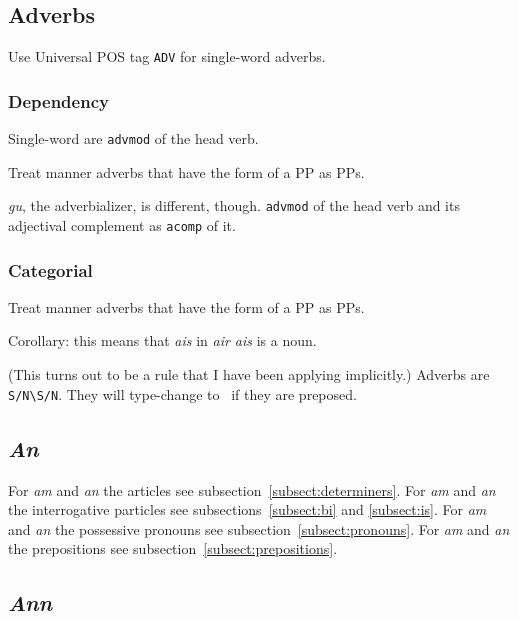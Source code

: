 \documentclass[a4paper]{article}
\begin{document}
\subsection{Adverbs\label{subsect:adverbs}}

Use Universal POS tag \texttt{ADV} for single-word adverbs.

\subsubsection*{Dependency}

 Single-word are \texttt{advmod} of the head verb.

 Treat manner adverbs that have the form of a PP as PPs.

 \textit{gu}, the adverbializer, is different, though.
\texttt{advmod} of the head verb and its adjectival complement as \texttt{acomp} of it.

\subsubsection*{Categorial}


\newcommand{\SsNbSsN}{\texttt{S/N\textbackslash S/N}}

 Treat manner adverbs that have the form of a PP as PPs.

 Corollary: this means that \textit{ais} in \textit{air ais}
is a noun.

 (This turns out to be a rule that I have been applying implicitly.) 
Adverbs are \SsNbSsN.
They will type-change to \SsS\ if they are preposed.



\subsection{\textit{An}}

For \textit{am} and \textit{an} the articles see subsection~\ref{subsect:determiners}.
For \textit{am} and \textit{an} the interrogative particles see subsections~\ref{subsect:bi} and \ref{subsect:is}.
For \textit{am} and \textit{an} the possessive pronouns see subsection~\ref{subsect:pronouns}.
For \textit{am} and \textit{an} the prepositions see subsection~\ref{subsect:prepositions}.

\subsection{\textit{Ann}}
\end{document}
